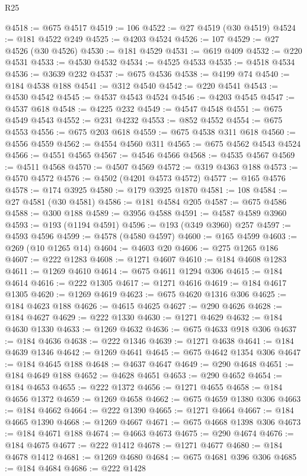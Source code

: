\begin{lexlean}{R25}
\begin{coremodule}
@4518 := @675 @4517
@4519 := 106
@4522 := @27 @4519 (@30 @4519)
@4524 := @181 @4522 @249
@4525 := @4203 @4524
@4526 := 107
@4529 := @27 @4526 (@30 @4526)
@4530 := @181 @4529
@4531 := @619 @409
@4532 := @220 @4531
@4533 := @4530 @4532
@4534 := @4525 @4533
@4535 := @4518 @4534
@4536 := @3639 @232
@4537 := @675 @4536
@4538 := @4199 @74
@4540 := @184 @4538 @188
@4541 := @312 @4540
@4542 := @220 @4541
@4543 := @4530 @4542
@4545 := @4537 @4543 @4524
@4546 := @4203 @4545
@4547 := @4537 @618
@4548 := @4225 @232
@4549 := @4547 @4548
@4551 := @675 @4549 @4543
@4552 := @231 @4232
@4553 := @852 @4552
@4554 := @675 @4553
@4556 := @675 @203 @618
@4559 := @675 @4538 @311 @618
@4560 := @4556 @4559
@4562 := @4554 @4560 @311
@4565 := @675 @4562 @4543 @4524
@4566 := @4551 @4565
@4567 := @4546 @4566
@4568 := @4535 @4567
@4569 := @4511 @4568
@4570 := @4507 @4569
@4572 := @319 @4363 @188
@4573 := @4570 @4572
@4576 := @4502 (@4201 @4573 @4572)
@4577 := @165 @4576
@4578 := @174 @3925
@4580 := @179 @3925 @1870
@4581 := 108
@4584 := @27 @4581 (@30 @4581)
@4586 := @181 @4584 @205
@4587 := @675 @4586
@4588 := @300 @188
@4589 := @3956 @4588
@4591 := @4587 @4589 @3960
@4593 := @193 (@1194 @4591)
@4596 := @193 (@349 @3960) @257
@4597 := @4593 @4596
@4599 := @4578 (@4580 @4597)
@4600 := @165 @4599
@4603 := @269 (@10 @1265 @14)
@4604 := @4603 @20
@4606 := @275 @1265 @186
@4607 := @222 @1283
@4608 := @1271 @4607
@4610 := @184 @4608 @1283
@4611 := @1269 @4610
@4614 := @675 @4611 @1294 @306
@4615 := @184 @4614
@4616 := @222 @1305
@4617 := @1271 @4616
@4619 := @184 @4617 @1305
@4620 := @1269 @4619
@4623 := @675 @4620 @1316 @306
@4625 := @184 @4623 @188
@4626 := @4615 @4625
@4627 := @290 @4626
@4628 := @184 @4627
@4629 := @222 @1330
@4630 := @1271 @4629
@4632 := @184 @4630 @1330
@4633 := @1269 @4632
@4636 := @675 @4633 @918 @306
@4637 := @184 @4636
@4638 := @222 @1346
@4639 := @1271 @4638
@4641 := @184 @4639 @1346
@4642 := @1269 @4641
@4645 := @675 @4642 @1354 @306
@4647 := @184 @4645 @188
@4648 := @4637 @4647
@4649 := @290 @4648
@4651 := @184 @4649 @188
@4652 := @4628 @4651
@4653 := @290 @4652
@4654 := @184 @4653
@4655 := @222 @1372
@4656 := @1271 @4655
@4658 := @184 @4656 @1372
@4659 := @1269 @4658
@4662 := @675 @4659 @1380 @306
@4663 := @184 @4662
@4664 := @222 @1390
@4665 := @1271 @4664
@4667 := @184 @4665 @1390
@4668 := @1269 @4667
@4671 := @675 @4668 @1398 @306
@4673 := @184 @4671 @188
@4674 := @4663 @4673
@4675 := @290 @4674
@4676 := @184 @4675
@4677 := @222 @1412
@4678 := @1271 @4677
@4680 := @184 @4678 @1412
@4681 := @1269 @4680
@4684 := @675 @4681 @396 @306
@4685 := @184 @4684
@4686 := @222 @1428

\end{coremodule}
\end{lexlean}
